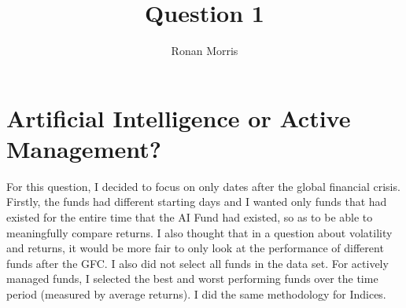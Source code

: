 \documentclass[11pt,preprint, authoryear]{elsarticle}
\numberwithin{equation}{section}
\numberwithin{figure}{section}
\numberwithin{table}{section}
\begin{document}
\begin{frontmatter}  %

\title{Question 1}





\author[Add1]{Ronan Morris}





\address[Add1]{Stellenbosch University}



\vspace{1cm}





\vspace{0.5cm}

\end{frontmatter}

\setcounter{footnote}{0}



\pagestyle{fancy}
\chead{}
\rhead{}
\lfoot{}
\lhead{}
\cfoot{}


\headsep 35pt %




\hypertarget{artificial-intelligence-or-active-management}{%
\section{Artificial Intelligence or Active
Management?}\label{artificial-intelligence-or-active-management}}

For this question, I decided to focus on only dates after the global
financial crisis. Firstly, the funds had different starting days and I
wanted only funds that had existed for the entire time that the AI Fund
had existed, so as to be able to meaningfully compare returns. I also
thought that in a question about volatility and returns, it would be
more fair to only look at the performance of different funds after the
GFC. I also did not select all funds in the data set. For actively
managed funds, I selected the best and worst performing funds over the
time period (measured by average returns). I did the same methodology
for Indices.
\end{document}
